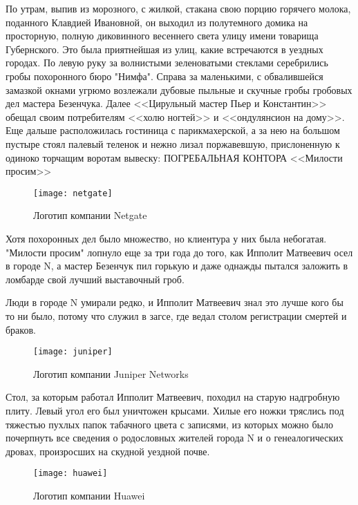 По утрам, выпив из морозного, с жилкой, стакана свою порцию горячего молока, поданного Клавдией Ивановной, он выходил из полутемного
домика на просторную, полную диковинного весеннего света улицу имени товарища Губернского. Это была приятнейшая из улиц, какие встречаются
в уездных городах. По левую руку за волнистыми зеленоватыми стеклами серебрились гробы похоронного бюро "Нимфа". Справа за маленькими,
с обвалившейся замазкой окнами угрюмо возлежали дубовые пыльные и скучные гробы гробовых дел мастера Безенчука.
Далее <<Цирульный мастер Пьер и Константин>> обещал своим потребителям <<холю ногтей>> и <<ондулянсион на дому>>.
Еще дальше расположилась гостиница с парикмахерской, а за нею на большом пустыре стоял палевый теленок и нежно лизал поржавевшую,
прислоненную к одиноко торчащим воротам вывеску: ПОГРЕБАЛЬНАЯ КОНТОРА <<Милости просим>>

\begin{figure}[ht]
    \centerfloat
    {
        \texttt{[image: netgate]}
    }
    \caption{Логотип компании Netgate}\label{fig:netgate}
\end{figure}

Хотя похоронных дел было множество, но клиентура у них была небогатая. "Милости просим" лопнуло еще за три года до того, как Ипполит Матвеевич
осел в городе N, а мастер Безенчук пил горькую и даже однажды пытался заложить в ломбарде свой лучший выставочный гроб.

Люди в городе N умирали редко, и Ипполит Матвеевич знал это лучше кого бы то ни было, потому что служил в загсе, где ведал столом
регистрации смертей и браков.

\begin{figure}[ht]
    \centerfloat
    {
        \texttt{[image: juniper]}
    }
    \caption{Логотип компании Juniper Networks}\label{fig:juniper}
\end{figure}

Стол, за которым работал Ипполит Матвеевич, походил на старую надгробную плиту.
Левый угол его был уничтожен крысами. Хилые его ножки тряслись под тяжестью пухлых папок табачного цвета
с записями, из которых можно было почерпнуть все сведения о родословных жителей города N и о генеалогических дровах,
произросших на скудной уездной почве.

\begin{figure}[ht]
    \centerfloat
    {
        \texttt{[image: huawei]}
    }
    \caption{Логотип компании Huawei}\label{fig:huawei}
\end{figure}

